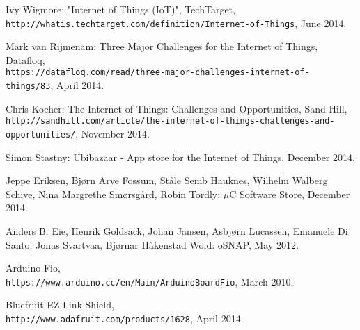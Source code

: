 \begin{thebibliography}{9}
Ivy Wigmore: "Internet of Things (IoT)", TechTarget,
\\\texttt{http://whatis.techtarget.com/definition/Internet-of-Things}, June 2014.

Mark van Rijmenam: Three Major Challenges for the Internet of Things, Datafloq, \\\texttt{https://datafloq.com/read/three-major-challenges-internet-of-things/83}, April 2014.

Chris Kocher: The Internet of Things: Challenges and Opportunities, Sand Hill, \\\texttt{http://sandhill.com/article/the-internet-of-things-challenges-and-opportunities/}, November 2014.

Simon Stastny: Ubibazaar - App store for the Internet of Things, December 2014.

Jeppe Eriksen, Bjørn Arve Fossum, Ståle Semb Hauknes, Wilhelm Walberg Schive, Nina Margrethe Smørsgård, Robin Tordly: \(\mu\)C Software Store, December 2014.

Anders B. Eie, Henrik Goldsack, Johan Jansen, Asbjørn Lucassen, Emanuele Di Santo, Jonas Svartvaa, Bjørnar Håkenstad Wold: oSNAP, May 2012.

Arduino Fio, \\\texttt{https://www.arduino.cc/en/Main/ArduinoBoardFio}, March 2010.

Bluefruit EZ-Link Shield, \\\texttt{http://www.adafruit.com/products/1628}, April 2014.

\end{thebibliography}
